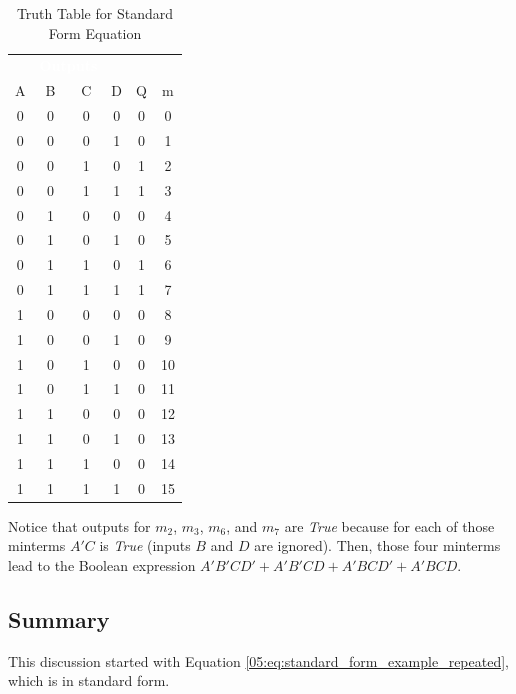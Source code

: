 \begin{table}[H]
  \sffamily
  \newcommand{\head}[1]{\textcolor{white}{\textbf{#1}}}    
  \begin{center}
    \begin{tabular}{cccc|cc} 
      \rowcolor{black!75}
      \multicolumn{4}{c}{\head{Inputs}} & \multicolumn{2}{c}{\head{Outputs}} \\
      A & B & C & D & Q & m \\
      \hline
      0 & 0 & 0 & 0 & 0 & 0 \\
      0 & 0 & 0 & 1 & 0 & 1 \\
      0 & 0 & 1 & 0 & 1 & 2 \\
      0 & 0 & 1 & 1 & 1 & 3 \\
      0 & 1 & 0 & 0 & 0 & 4 \\
      0 & 1 & 0 & 1 & 0 & 5 \\
      0 & 1 & 1 & 0 & 1 & 6 \\
      0 & 1 & 1 & 1 & 1 & 7 \\
      1 & 0 & 0 & 0 & 0 & 8 \\
      1 & 0 & 0 & 1 & 0 & 9 \\
      1 & 0 & 1 & 0 & 0 & 10 \\
      1 & 0 & 1 & 1 & 0 & 11 \\
      1 & 1 & 0 & 0 & 0 & 12 \\
      1 & 1 & 0 & 1 & 0 & 13 \\
      1 & 1 & 1 & 0 & 0 & 14 \\
      1 & 1 & 1 & 1 & 0 & 15 
    \end{tabular}
  \end{center}
  \caption{Truth Table for Standard Form Equation}
  \label{05:tab:truth_table_for_expression_with_missing_variables}
\end{table}

Notice that outputs for $ m_2 $, $ m_3 $, $ m_6 $, and $ m_7 $ are \emph{True} because for each of those minterms $ A'C $ is \emph{True} (inputs $ B $ and $ D $ are ignored). Then, those four minterms lead to the Boolean expression $ A'B'CD'+A'B'CD+A'BCD'+A'BCD $.

\subsection{Summary}
\label{05:subsec:summary_of_canonical_forms}

This discussion started with Equation \ref{05:eq:standard_form_example_repeated}, which is in standard form.

